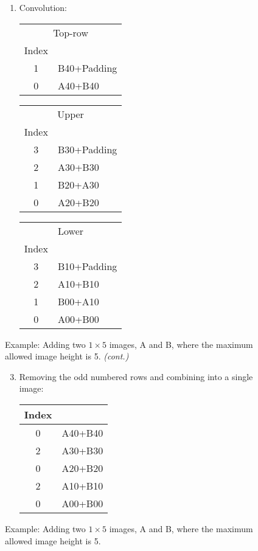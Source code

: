 \documentclass[12pt]{report}
\def\byX {\!\!\times\!\!}
\begin{document}
\begin{figure}[H]
\begin{mdframed}[style=default]
\begin{enumerate}
\item Convolution:
\begin{center}
\begin{tabular}{cl}
\multicolumn{2}{c}{Top-row}\\
Index &\ \\
\hline
1 & B40+Padding\\
0 & A40+B40\\
\end{tabular}
\end{center}
\begin{center}
\begin{tabular}{cl}
\multicolumn{2}{c}{Upper}\\
Index &\ \\
\hline
3 & B30+Padding\\
2 & A30+B30\\
1 & B20+A30\\
0 & A20+B20\\
\end{tabular}
\end{center}
\begin{center}
\begin{tabular}{cl}
\multicolumn{2}{c}{Lower}\\
Index &\ \\
\hline
3 & B10+Padding\\
2 & A10+B10\\
1 & B00+A10\\
0 & A00+B00\\
\end{tabular}
\end{center}
\end{enumerate}
\end{mdframed}
\caption{Example: Adding two $1\byX 5$ images, A and B, where the
  maximum allowed image height is 5. \emph{(cont.)}}
\end{figure}
\pagebreak
\begin{figure}[H]
\ContinuedFloat
\begin{mdframed}[style=default]
\begin{enumerate}
\setcounter{enumi}{2}
\item Removing the odd numbered rows and combining into a single image:
\begin{center}
\begin{tabular}{cl}
Index &\ \\
\hline
0 & A40+B40\\
2 & A30+B30\\
0 & A20+B20\\
2 & A10+B10\\
0 & A00+B00\\
\end{tabular}
\end{center}
\end{enumerate}
\end{mdframed}
\caption{Example: Adding two $1\byX 5$ images, A and B, where the
  maximum allowed image height is 5.}
\end{figure}
\end{document}
